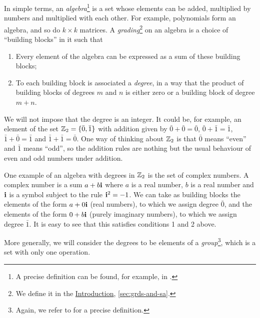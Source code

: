 \begin{prefatory}
In simple terms, an \emph{algebra}\footnote{A precise definition can be found, for example, in \cite[Chapter 1]{MR3932087}.}
is a set whose elements can be added, multiplied by numbers and multiplied with each other. 
For example, polynomials form an algebra, and so do $k \times k$ matrices. 
A \emph{grading}\footnote{We define it in the \hyperref[chap:intro]{Introduction}, \cref{sec:grds-and-sa}.
} 
on an algebra is a choice of ``building blocks'' in it such that
\begin{enumerate}
    \item Every element of the algebra can be expressed as a sum of these building blocks;
    \item To each building block is associated a \emph{degree}, in a way that the product of building blocks of degrees $m$ and $n$ is either zero or a building block of degree $m+n$.
\end{enumerate}
We will not impose that the degree is an integer. 
It could be, for example, an element of the set $\mathbb{Z}_2 = \{ \bar 0, \bar 1 \}$ with addition given by 
$\bar 0 + \bar 0 = \bar 0$, 
$\bar 0 + \bar 1 = \bar 1$, 
$\bar 1 + \bar 0 = \bar 1$ and 
$\bar 1 + \bar 1 = \bar 0$. 
One way of thinking about $\mathbb{Z}_2$ is that $\bar 0$ means ``even'' and $\bar 1$ means ``odd'', so the addition rules are nothing but the usual behaviour of even and odd numbers under addition. 

One example of an algebra with degrees in $\mathbb{Z}_2$ is the set of complex numbers. 
A complex number is a sum $a + b\mathbf{i}$ where $a$ is a real number, $b$ is a real number and $\mathbf{i}$ is a symbol subject to the rule $\mathbf{i}^2 = -1$. 
We can take as building blocks the elements of the form $a + 0\mathbf{i}$ (real numbers), to which we assign degree $\bar 0$, and the elements of the form $0 + b\mathbf{i}$ (purely imaginary numbers), to which we assign degree $\bar 1$. 
It is easy to see that this satisfies conditions 1 and 2 above. 

More generally, we will consider the degrees to be elements of a \emph{group}\footnote{Again, we refer to \cite[Chapter 1]{MR3932087} for a precise definition.}, which is a set with only one operation. 


\end{prefatory}
